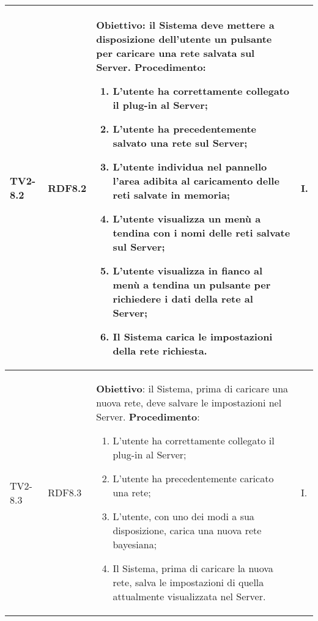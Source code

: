 \begin{longtable}{|C{.15\textwidth}|C{.13\textwidth}|m{.52\textwidth}|C{.08\textwidth}|}
TV2-8.2 & RDF8.2 &
	\textbf{Obiettivo}: il Sistema deve mettere a disposizione dell'utente un pulsante per caricare una rete salvata sul Server. \newline
	\textbf{Procedimento}:
	\begin{enumerate}
		\item L'utente ha correttamente collegato il plug-in al Server;
		\item L'utente ha precedentemente salvato una rete sul Server;
		\item L'utente individua nel pannello l'area adibita al caricamento delle reti salvate in memoria;
		\item L'utente visualizza un menù a tendina con i nomi delle reti salvate sul Server;
		\item L'utente visualizza in fianco al menù a tendina un pulsante per richiedere i dati della rete al Server;
		\item Il Sistema carica le impostazioni della rete richiesta.
	\end{enumerate}
	& I. \\
\hline

TV2-8.3 & RDF8.3 &
	\textbf{Obiettivo}: il Sistema, prima di caricare una nuova rete, deve salvare le impostazioni nel Server. \newline
	\textbf{Procedimento}:
	\begin{enumerate}
		\item L'utente ha correttamente collegato il plug-in al Server;
		\item L'utente ha precedentemente caricato una rete;
		\item L'utente, con uno dei modi a sua disposizione, carica una nuova rete bayesiana;
		\item Il Sistema, prima di caricare la nuova rete, salva le impostazioni di quella attualmente visualizzata nel Server.
	\end{enumerate}
	& I. \\
\hline	


\end{longtable}
